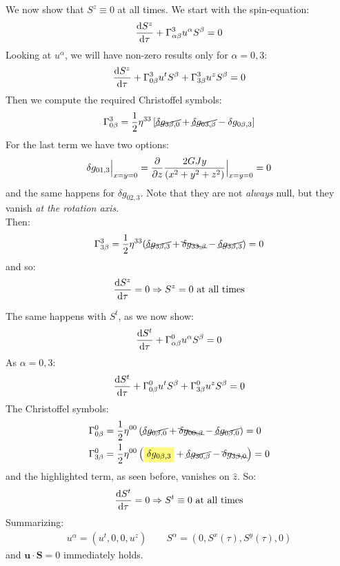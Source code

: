 \documentclass[../template.tex]{subfiles}
\begin{document}
We now show that $S^z \equiv 0$ at all times. We start with the spin-equation:
\begin{align*}
    \dv{S^z}{\tau} + \Gamma^3_{\alpha \beta} u^\alpha S^\beta
 = 0
\end{align*} 
Looking at $u^\alpha$, we will have non-zero results only for $\alpha = 0,3$:
\begin{align*}
    \dv{S^z}{\tau} + \Gamma_{0 \beta}^3 u^t S^\beta + \Gamma_{3 \beta}^3 u^z S^\beta = 0
\end{align*}  
Then we compute the required Christoffel symbols:
\begin{align*}
    \Gamma_{0 \beta}^3 = \frac{1}{2} \eta^{33} \left[\cancel{\delta g_{3 \beta,0}} + \cancel{\delta g_{03, \beta} }- \delta g_{0 \beta,3}\right] 
\end{align*}
For the last term we have two options:
\begin{align*}
    \delta g_{01,3} \Big|_{x=y=0} = \pdv{z} \frac{2GJy}{(x^2 +y^2 + z^2)} \Big|_{x=y=0} = 0 
\end{align*}
and the same happens for $\delta g_{02,3}$. Note that they are not \textit{always} null, but they vanish \textit{at the rotation axis}.\\

Then:
\begin{align*}
    \Gamma^3_{3 \beta} = \frac{1}{2} \eta^{33} (\cancel{\delta g_{3 \beta, 3} }+ \bcancel{\delta g_{33, \beta}} - \cancel{\delta g_{3 \beta,3}}) = 0
\end{align*}
and so:
\begin{align*}
    \dv{S^z}{\tau} = 0 \Rightarrow S^z = 0 \text{ at all times}
\end{align*}

The same happens with $S^t$, as we now show:
\begin{align*}
    \dv{S^t}{\tau} + \Gamma^0_{\alpha \beta} u^\alpha S^\beta = 0
\end{align*} 
As $\alpha = 0,3$:
\begin{align*}
    \dv{S^t}{\tau} + \Gamma^0_{0 \beta} u^t S^\beta + \Gamma_{3 \beta}^0 u^z S^\beta = 0
\end{align*} 
The Christoffel symbols:
\begin{align*}
    \Gamma_{0 \beta}^0 &= \frac{1}{2} \eta^{00} \left( \cancel{\delta g_{0 \beta,0} }+ \bcancel{\delta g_{00, \beta}} -\cancel{ \delta g_{0 \beta,0}}\right) = 0\\
    \Gamma_{3 \beta}^0 &= \frac{1}{2} \eta^{00} \left(\hlc{Yellow}{\delta g_{0 \beta,3} }+ \cancel{\delta g_{30, \beta}} - \bcancel{\delta g_{3 \beta ,0}}\right) = 0
\end{align*}
and the highlighted term, as seen before, vanishes on $\hat{z}$. So:
\begin{align*}
    \dv{S^t}{\tau} = 0 \Rightarrow S^t \equiv 0 \text{ at all times}
\end{align*}
Summarizing:
\begin{align*}
    u^\alpha = (u^t, 0,0,u^z) \qquad S^\alpha = (0,S^x(\tau), S^y(\tau),0)
\end{align*}
and $\bm{u} \cdot \bm{S} = 0$ immediately holds.
\end{document}

